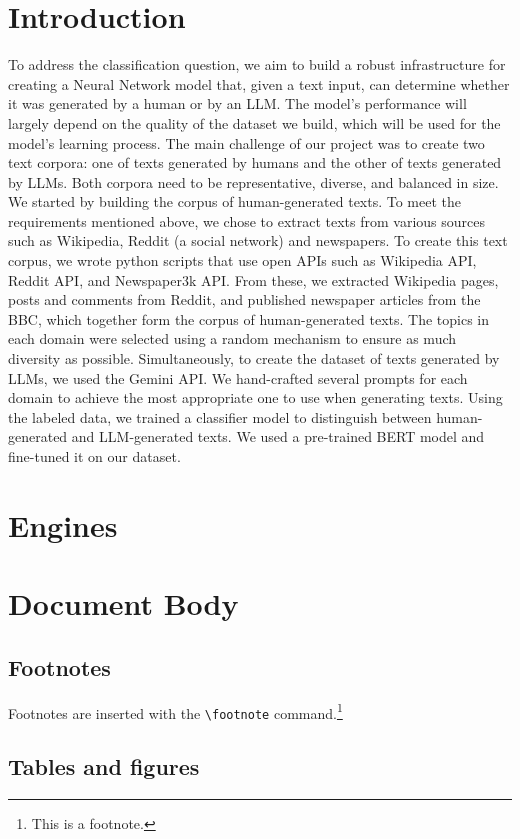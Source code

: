 \documentclass[11pt]{article}
\begin{document}
\section{Introduction}
To address the classification question, we aim to build a robust infrastructure for creating a Neural Network model that, given a text input, can determine whether it was generated by a human or by an LLM. The model's performance will largely depend on the quality of the dataset we build, which will be used for the model's learning process.
The main challenge of our project was to create two text corpora: one of texts generated by humans and the other of texts generated by LLMs. Both corpora need to be representative, diverse, and balanced in size.
We started by building the corpus of human-generated texts. To meet the requirements mentioned above, we chose to extract texts from various sources such as Wikipedia, Reddit (a social network) and newspapers.
To create this text corpus, we wrote python scripts that use open APIs such as Wikipedia API, Reddit API, and Newspaper3k API. From these, we extracted Wikipedia pages, posts and comments from Reddit, and published newspaper articles from the BBC, which together form the corpus of human-generated texts. The topics in each domain were selected using a random mechanism to ensure as much diversity as possible.
Simultaneously, to create the dataset of texts generated by LLMs, we used the Gemini API. We hand-crafted several prompts for each domain to achieve the most appropriate one to use when generating texts.
Using the labeled data, we trained a classifier model to distinguish between human-generated and LLM-generated texts. We used a pre-trained BERT model and fine-tuned it on our dataset. 

\section{Engines}

\section{Document Body}

\subsection{Footnotes}

Footnotes are inserted with the \verb|\footnote| command.\footnote{This is a footnote.}

\subsection{Tables and figures}
\end{document}
